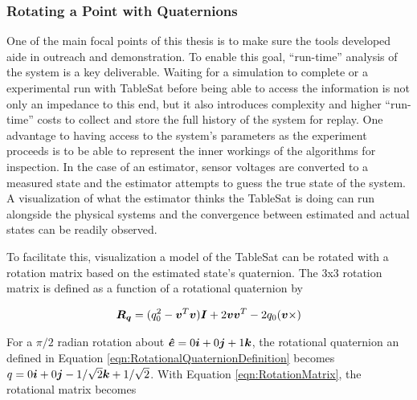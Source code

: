 \subsubsection{Rotating a Point with Quaternions}
\label{subsubsec:RotatingaPointwithQuaternions}

One of the main focal points of this thesis is to make sure the tools developed aide in outreach and demonstration.  To enable this goal, ``run-time'' analysis of the system is a key deliverable.  Waiting for a simulation to complete or a experimental run with TableSat before being able to access the information is not only an impedance to this end, but it also introduces complexity and higher ``run-time'' costs to collect and store the full history of the system for replay.  One advantage to having access to the system's parameters as the experiment proceeds is to be able to represent the inner workings of the algorithms for inspection.  In the case of an estimator, sensor voltages are converted to a measured state and the estimator attempts to guess the true state of the system.  A visualization of what the estimator thinks the TableSat is doing can run alongside the physical systems and the convergence between estimated and actual states can be readily observed.

To facilitate this, visualization a model of the TableSat can be rotated with a rotation matrix based on the estimated state's quaternion.  The 3x3 rotation matrix is defined as a function of a rotational quaternion by

\begin{equation}
  \boldsymbol{R_q} = (q_0^2 - \boldsymbol{v}^T \boldsymbol{v}) \boldsymbol{I} + 2 \boldsymbol{v} \boldsymbol{v}^T - 2 q_0 (\boldsymbol{v} \times)
  \label{eqn:RotationMatrix}
\end{equation}

For a $\pi/2$ radian rotation about $\boldsymbol{\hat{e}} = 0\boldsymbol{i}+0\boldsymbol{j}+1\boldsymbol{k}$, the rotational quaternion an defined in Equation \ref{eqn:RotationalQuaternionDefinition} becomes $q = 0\boldsymbol{i}+0\boldsymbol{j}-1/\sqrt{2}\boldsymbol{k}+1/\sqrt{2}$.  With Equation \ref{eqn:RotationMatrix}, the rotational matrix becomes

